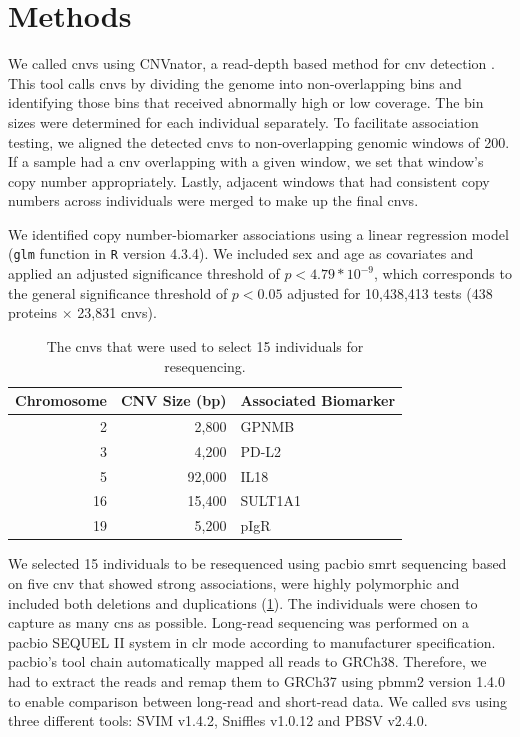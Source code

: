 \documentclass[draft]{scrbook}
\begin{document}
\section{Methods}
We called \glspl{cnv} using \textsf{CNVnator}, a read-depth based method for \gls{cnv} detection \cite{Abyzov2011b}.
This tool calls \glspl{cnv} by dividing the genome into non-overlapping bins and identifying those bins that received abnormally high or low coverage.
The bin sizes were determined for each individual separately.
To facilitate association testing, we aligned the detected \glspl{cnv} to non-overlapping genomic windows of \qty{200}{\base}.
If a sample had a \gls{cnv} overlapping with a given window, we set that window's copy number appropriately.
Lastly, adjacent windows that had consistent copy numbers across individuals were merged to make up the final \glspl{cnv}.

We identified copy number-biomarker associations using a linear regression model (\texttt{glm} function in \texttt{R} version 4.3.4).
We included sex and age as covariates and applied an adjusted significance threshold of \(p < 4.79*10^{-9}\), which corresponds to the general significance threshold of $p < 0.05$ adjusted for 10,438,413 tests (438 proteins $\times$ 23,831 \glspl{cnv}).

\begin{table}
    \centering
    \begin{tabular}{r r l}
        \toprule
        \textbf{Chromosome} & \textbf{CNV Size (bp)} & \textbf{Associated Biomarker} \\
        \midrule
        2 & 2,800 & GPNMB \\
        3 & 4,200 & PD-L2 \\
        5 & 92,000 & IL18 \\
        16 & 15,400 & SULT1A1 \\
        19 & 5,200 & pIgR \\
        \bottomrule
    \end{tabular}
    \caption{The \glspl{cnv} that were used to select 15 individuals for resequencing.}
    \label{tab:primecnvs}
\end{table}

We selected 15 individuals to be resequenced using \gls{pacbio} \gls{smrt} sequencing based on five \gls{cnv} that showed strong associations, were highly polymorphic and included both deletions and duplications (\cref{tab:primecnvs}).
The individuals were chosen to capture as many \glspl{cn} as possible.
Long-read sequencing was performed on a \gls{pacbio} SEQUEL II system in \gls{clr} mode according to manufacturer specification.
\gls{pacbio}'s tool chain automatically mapped all reads to GRCh38.
Therefore, we had to extract the reads and remap them to GRCh37 using \textsf{pbmm2} version 1.4.0 to enable comparison between long-read and short-read data.
We called \glspl{sv} using three different tools: \textsf{SVIM} v1.4.2, \textsf{Sniffles} v1.0.12 and \textsf{PBSV} v2.4.0.
\end{document}
